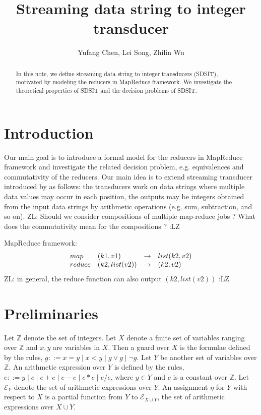 \documentclass[11pt]{article}
\title{Streaming data string to integer transducer}
\author{Yufang Chen, Lei Song, Zhilin Wu}
\def\Ee{{\mathcal{E} }}
\def\Ii{{\mathbb{Z} }}
\newcommand{\zhilin}[1]{\color{cyan} {ZL: #1 :LZ} \color{black}}
\begin{document}
\maketitle

\begin{abstract}
In this note, we define streaming data string to integer transducers (SDSIT), motivated by modeling the reducers in MapReduce framework. We investigate the theoretical properties of SDSIT and the decision problems of SDSIT. 
\end{abstract}

\section{Introduction}

Our main goal is to introduce a formal model for the reducers in MapReduce framework and investigate the related decision problem, e.g. equivalences and commutativity of the reducers. Our main idea is to extend streaming transducer introduced by \cite{RP11} as follows: the transducers work on data strings where multiple data values may occur in each position, the outputs may be integers obtained from the input data strings by arithmetic operations (e.g. sum, subtraction, and so on). \zhilin{Should we consider compositions of multiple map-reduce jobs ? What does the commutativity mean for the compositions ?} 

MapReduce framework:
\[
\begin{array}{l l c l} 
map & (k1,v1) & \rightarrow & list(k2,v2)\\
reduce & (k2,list(v2)) & \rightarrow & (k2,v2) 
\end{array}
\]
\zhilin{in general, the reduce function can also output $(k2, list(v2))$}

\section{Preliminaries}

Let $\Ii$ denote the set of integers. Let $X$ denote a finite set of variables ranging over $\Ii$ and $x,y$ are variables in $X$. Then a guard over $X$ is the formulae defined by the rules, $g::= x = y \mid x < y \mid g \vee g \mid \neg g$. Let $Y$ be another set of variables over $\Ii$. An arithmetic expression over $Y$ is defined by the rules, $e::= y \mid c \mid e + e \mid e-e \mid e * e \mid e / e$, where $y \in Y$ and $c$ is a constant over $\Ii$. Let $\Ee_Y$ denote the set of arithmetic expressions over $Y$. An assignment $\eta$ for $Y$ with respect to $X$ is a partial function from $Y$ to $\Ee_{X \cup Y}$, the set of arithmetic expressions over $X \cup Y$.
\end{document}
